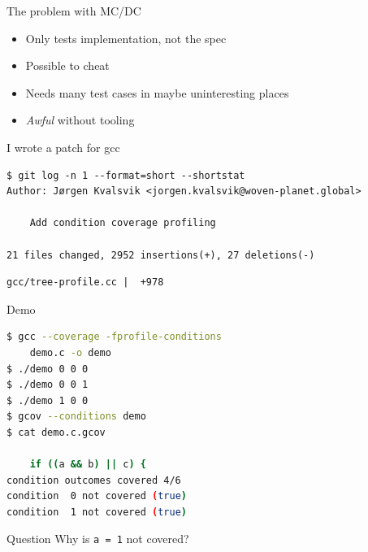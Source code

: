 \documentclass[xcolor = {dvipsnames, table}]{beamer}
\begin{document}
\begin{frame}
    The problem with MC/DC

    \begin{itemize}
        \item Only tests implementation, not the spec
        \item Possible to cheat
        \item Needs many test cases in maybe uninteresting places
        \item \emph{Awful} without tooling
    \end{itemize}
\end{frame}

\begin{frame}[fragile]
    I wrote a patch for gcc

    \begin{block}{}
        \begin{Verbatim}[fontsize = \footnotesize]
$ git log -n 1 --format=short --shortstat
Author: Jørgen Kvalsvik <jorgen.kvalsvik@woven-planet.global>

    Add condition coverage profiling

21 files changed, 2952 insertions(+), 27 deletions(-)
        \end{Verbatim}
    \end{block}

    \begin{block}{}
        \begin{Verbatim}[fontsize=\footnotesize]
 gcc/tree-profile.cc |  +978
        \end{Verbatim}
    \end{block}
\end{frame}

\begin{frame}[fragile]
    \begin{block}{Demo}
        \begin{lstlisting}[language = sh, basicstyle = \scriptsize\ttfamily]
$ gcc --coverage -fprofile-conditions
    demo.c -o demo
$ ./demo 0 0 0
$ ./demo 0 0 1
$ ./demo 1 0 0
$ gcov --conditions demo
$ cat demo.c.gcov

    if ((a && b) || c) {
condition outcomes covered 4/6
condition  0 not covered (true)
condition  1 not covered (true)
        \end{lstlisting}
    \end{block}

    \begin{block}{Question}
        Why is \lstinline{a = 1} not covered?
    \end{block}
\end{frame}
\end{document}

